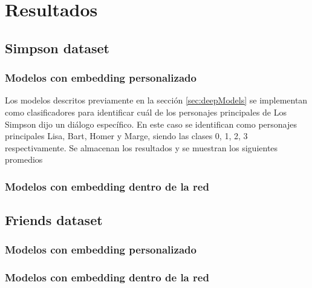 \section{Resultados}

\subsection{Simpson dataset}

\subsubsection{Modelos con embedding personalizado}

Los modelos descritos previamente en la sección \ref{sec:deepModels} se implementan como clasificadores para identificar cuál de los personajes principales de Los Simpson dijo un diálogo específico. En este caso se identifican como personajes principales Lisa, Bart, Homer y Marge, siendo las clases 0, 1, 2, 3 respectivamente. Se almacenan los resultados y se muestran los siguientes promedios 

\subsubsection{Modelos con embedding dentro de la red}


\subsection{Friends dataset}

\subsubsection{Modelos con embedding personalizado}
\subsubsection{Modelos con embedding dentro de la red}